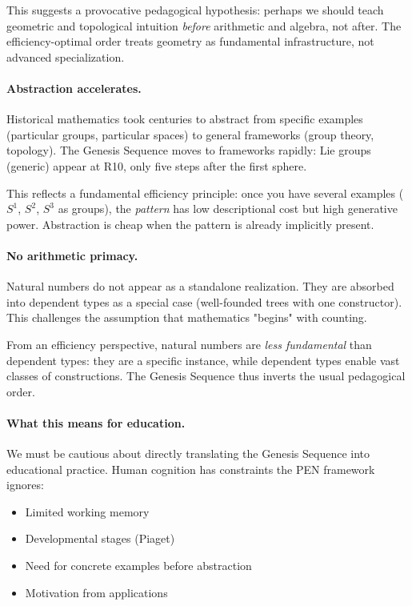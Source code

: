 \documentclass[11pt]{article}
\theoremstyle{definition}
\begin{document}
This suggests a provocative pedagogical hypothesis: perhaps we should teach geometric and topological intuition \emph{before} arithmetic and algebra, not after. The efficiency-optimal order treats geometry as fundamental infrastructure, not advanced specialization.

\paragraph{Abstraction accelerates.}
Historical mathematics took centuries to abstract from specific examples (particular groups, particular spaces) to general frameworks (group theory, topology). The Genesis Sequence moves to frameworks rapidly: Lie groups (generic) appear at R10, only five steps after the first sphere.

This reflects a fundamental efficiency principle: once you have several examples ($S^1$, $S^2$, $S^3$ as groups), the \emph{pattern} has low descriptional cost but high generative power. Abstraction is cheap when the pattern is already implicitly present.

\paragraph{No arithmetic primacy.}
Natural numbers do not appear as a standalone realization. They are absorbed into dependent types as a special case (well-founded trees with one constructor). This challenges the assumption that mathematics "begins" with counting.

From an efficiency perspective, natural numbers are \emph{less fundamental} than dependent types: they are a specific instance, while dependent types enable vast classes of constructions. The Genesis Sequence thus inverts the usual pedagogical order.

\paragraph{What this means for education.}

We must be cautious about directly translating the Genesis Sequence into educational practice. Human cognition has constraints the PEN framework ignores:
\begin{itemize}
\item Limited working memory
\item Developmental stages (Piaget)
\item Need for concrete examples before abstraction
\item Motivation from applications
\end{itemize}
\end{document}
